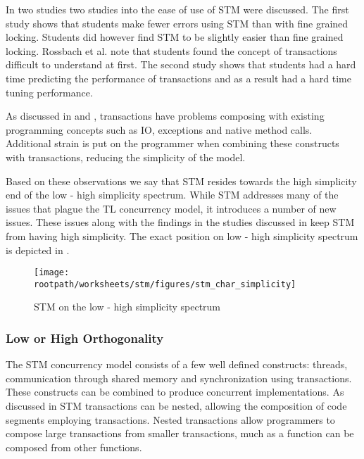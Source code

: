 In  two studies two studies into the ease of use of \ac{STM} were discussed. The first study shows that students make fewer errors using \ac{STM} than with fine grained locking. Students did however find \ac{STM} to be slightly easier than fine grained locking. Rossbach et al. note that students found the concept of transactions difficult to understand at first. The second study shows that students had a hard time predicting the performance of transactions and as a result had a hard time tuning performance.

As discussed in  and , transactions have problems composing with existing programming concepts such as \ac{IO}, exceptions and native method calls. Additional strain is put on the programmer when combining these constructs with transactions, reducing the simplicity of the model.

Based on these observations we say that \ac{STM} resides towards the high simplicity end of the low - high simplicity spectrum. While \ac{STM} addresses many of the issues that plague the \ac{TL} concurrency model, it introduces a number of new issues. These issues along with the findings in the studies discussed in  keep \ac{STM} from having high simplicity. The exact position on low - high simplicity spectrum is depicted in .

\begin{figure}[htbp]
\centering
 \texttt{[image: \\rootpath/worksheets/stm/figures/stm\_char\_simplicity]} 
 \caption{\ac{STM} on the low - high simplicity spectrum}
\label{fig:stm_char_simplicity}
\end{figure}

\subsubsection{Low or High Orthogonality}\label{sec:stm_orthogonality}
\label{subsec:stm_orthogonality}
The \ac{STM} concurrency model consists of a few well defined constructs: threads, communication through shared memory and synchronization using transactions. These constructs can be combined to produce concurrent implementations. As discussed in  \ac{STM} transactions can be nested, allowing the composition of code segments employing transactions. Nested transactions allow programmers to compose large transactions from smaller transactions, much as a function can be composed from other functions.

